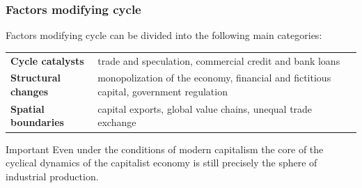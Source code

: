 \begin{frame}
  \frametitle{Factors modifying cycle}
  Factors modifying cycle can be divided into the following main categories:

  \vspace{10pt}

  \begin{tabularx}{\textwidth}{l>{\raggedright\arraybackslash\hyphenpenalty=10000\exhyphenpenalty=10000}X}
    \textbf{Cycle catalysts} & trade and speculation, commercial credit and bank loans \\
    \textbf{Structural changes} & monopolization of the economy, financial and fictitious capital, government regulation \\
    \textbf{Spatial boundaries} & capital exports, global value chains, unequal trade exchange
  \end{tabularx}

  \begin{alertblock}{Important}
    Even under the conditions of modern capitalism the core of the cyclical dynamics of the capitalist economy is still precisely the sphere of industrial production.
  \end{alertblock}
\end{frame}